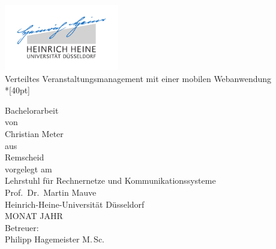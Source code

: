 
\begin{titlepage}
  \centering
  \includegraphics[width=5cm]{fig/unilogo}\\

  \vfill
  \huge
  Verteiltes Veranstaltungsmanagement mit einer mobilen Webanwendung\\*[40pt]
  \normalsize

  \vfill
  \large
  Bachelorarbeit\\[0.25em]
  \normalsize
  von\\
  \Large
  Christian Meter\\

  \vspace{5mm}
  \normalsize
  aus\\ Remscheid\\[1cm]
  vorgelegt am\\[5mm]
  Lehrstuhl für Rechnernetze und Kommunikationssysteme\\
  Prof.\ Dr.\ Martin Mauve\\ 
  Heinrich-Heine-Universität Düsseldorf\\[0.5cm]
  MONAT JAHR\\[0.5cm]
  Betreuer:\\
  Philipp Hagemeister M.\,Sc.
    
\end{titlepage}


